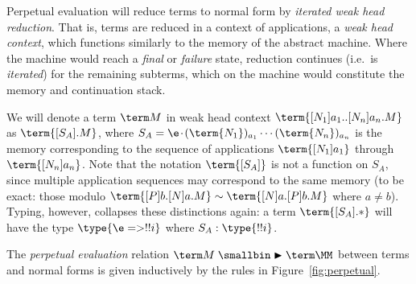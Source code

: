 \documentclass[a4paper,UKenglish,cleveref, autoref, thm-restate]{lipics-v2021}
\newcommand\msep{\kern1pt{\cdot}\kern1pt}
\newcommand\rp{\mathrel{\smallbin\blacktriangleright}}
\begin{document}
Perpetual evaluation will reduce terms to normal form by \emph{iterated weak head reduction}. That is, terms are reduced in a context of applications, a \emph{weak head context}, which functions similarly to the memory of the abstract machine. Where the machine would reach a \emph{final} or \emph{failure} state, reduction continues (i.e.\ is \emph{iterated}) for the remaining subterms, which on the machine would constitute the memory and continuation stack.

We will denote a term $\term M$ in weak head context $\term{[N_1]a_1..[N_n]a_n.M}$ as $\term{[S_A].M}$, where $S_A=\e\msep(\term{N_1})_{a_1}\cdots(\term{N_n})_{a_n}$ is the memory corresponding to the sequence of applications $\term{[N_1]a_1}$ through $\term{[N_n]a_n}$. Note that the notation $\term{[S_A]}$ is not a function on $S_A$, since multiple application sequences may correspond to the same memory (to be exact: those modulo $\term{[P]b.[N]a.M}\sim\term{[N]a.[P]b.M}$ where $a\neq b$). Typing, however, collapses these distinctions again: a term $\term{[S_A].*}$ will have the type $\type{\e => !!i}$ where $S_A:\type{!!i}$.

\begin{definition}
\label{def:perpetual}
The \emph{perpetual evaluation} relation $\term M\rp\term\MM$ between terms and normal forms is given inductively by the rules in Figure~\ref{fig:perpetual}.
\end{definition}
\end{document}
